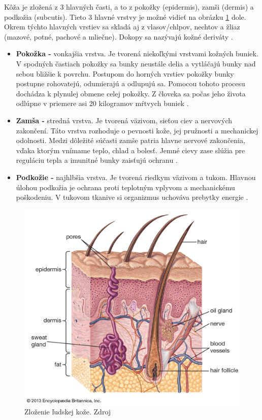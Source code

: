 Kôža je zložená z 3 hlavných časti, a to z pokožky (epidermis), zamši (dermis) a podkožia (subcutis). Tieto 3 hlavné vrstvy je možné vidieť na obrázku \ref{fig:koza} dole. Okrem týchto hlavných vrstiev sa skladá aj z vlasov/chlpov, nechtov a žliaz (mazové, potné, pachové a mliečne). Dokopy sa nazývajú kožné deriváty \cite{Pokorna2012}. 
\begin{itemize}  
\item \textbf{Pokožka -} vonkajšia vrstva. Je tvorená niekoľkými vrstvami kožných buniek. V spodných častiach pokožky sa bunky neustále delia a vytláčajú bunky nad sebou bližšie k povrchu. Postupom do horných vrstiev pokožky bunky postupne rohovatejú, odumierajú a odlupujú sa. Pomocou tohoto procesu dochádza k plynulej obmene celej pokožky. Z človeka sa počas jeho života odlúpne v priemere asi 20 kilogramov mŕtvych buniek \cite{pcCdSrbbhhlr5YcQ}. 
\item \textbf{Zamša -} stredná vrstva. Je tvorená väzivom, sieťou ciev a nervových zakončení. Táto vrstva rozhoduje o pevnosti kože, jej pružnosti a mechanickej odolnosti. Medzi dôležité súčasti zamše patria hlavne nervové zakončenia, vďaka ktorým vnímame teplo, chlad a bolesť. Jemné cievy zase slúžia pre reguláciu tepla a imunitné bunky zaisťujú ochranu \cite{pcCdSrbbhhlr5YcQ}.
\item \textbf{Podkožie -} najhlbšia vrstva. Je tvorená riedkym väzivom a tukom. Hlavnou úlohou podkožia je ochrana proti teplotným vplyvom a mechanickému poškodeniu. V tukovom tkanive si organizmus uchováva prebytky energie \cite{pcCdSrbbhhlr5YcQ, Hlinkova2015}. 
\end{itemize}
\begin{figure}[h]
  \centering
  \includegraphics[scale=0.19]{fig/koza.jpg}
  \caption{Zloženie ľudskej kože. Zdroj \cite{Ebling2016}}
  \label{fig:koza}
\end{figure}

